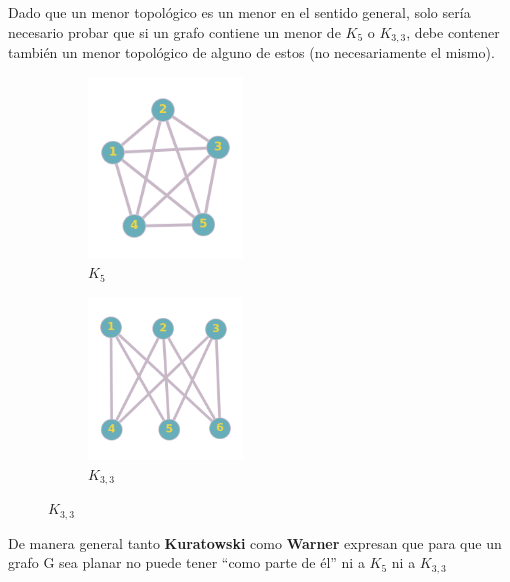 \documentclass[a4paper,1pt]{report}
\begin{document}
Dado que un menor topológico es un menor en el sentido general, solo sería necesario probar que si un grafo contiene un menor de $K_5$ o  $K_{3,3}$, debe contener también un menor topológico de alguno de estos (no necesariamente el mismo).\\

\begin{figure}[H]
    \centering
    \begin{subfigure}[b]{0.45\textwidth}
        \centering
        \includegraphics[width=0.45\textwidth]{figures5/K5.png}
        \caption{$K_5$}
    \end{subfigure}
    \begin{subfigure}[b]{0.45\textwidth}
        \centering
        \includegraphics[width=0.45\textwidth]{figures5/K33.png}
        \caption{$K_{3,3}$}
    \end{subfigure}
\end{figure} 

De manera general tanto \textbf{Kuratowski} como \textbf{Warner} expresan que para que un grafo  G sea planar no puede tener ``como parte de \'el'' ni a $K_5$ ni a $K_{3,3}$ 
\end{document}
